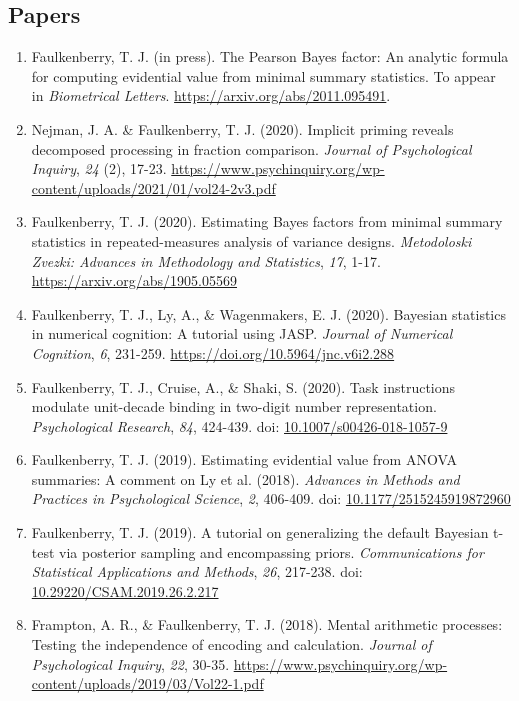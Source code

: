 \documentclass[article,10pt]{article}
\begin{document}
\subsection*{Papers}
\label{sec:org54b51a6}
\begin{enumerate}
\item Faulkenberry, T. J. (in press). The Pearson Bayes factor: An analytic formula for computing evidential value from minimal summary statistics. To appear in \emph{Biometrical Letters}. \url{https://arxiv.org/abs/2011.095491}.
\item Nejman, J. A. \& Faulkenberry, T. J. (2020). Implicit priming reveals decomposed processing in fraction comparison. \emph{Journal of Psychological Inquiry}, \emph{24} (2), 17-23. \url{https://www.psychinquiry.org/wp-content/uploads/2021/01/vol24-2v3.pdf}
\item Faulkenberry, T. J. (2020). Estimating Bayes factors from minimal summary statistics in repeated-measures analysis of variance designs. \emph{Metodoloski Zvezki: Advances in Methodology and Statistics}, \emph{17}, 1-17.  \url{https://arxiv.org/abs/1905.05569}
\item Faulkenberry, T. J., Ly, A., \& Wagenmakers, E. J. (2020). Bayesian statistics in numerical cognition: A tutorial using JASP. \emph{Journal of Numerical Cognition}, \emph{6}, 231-259. \url{https://doi.org/10.5964/jnc.v6i2.288}
\item Faulkenberry, T. J., Cruise, A., \& Shaki, S. (2020). Task instructions modulate unit-decade binding in two-digit number representation. \emph{Psychological Research}, \emph{84}, 424-439. doi: \href{https://dx.doi.org/10.1007/s00426-018-1057-9}{10.1007/s00426-018-1057-9}
\item Faulkenberry, T. J. (2019). Estimating evidential value from ANOVA summaries: A comment on Ly et al. (2018). \emph{Advances in Methods and Practices in Psychological Science}, \emph{2}, 406-409. doi: \href{https://doi.org/10.1177/2515245919872960}{10.1177/2515245919872960}
\item Faulkenberry, T. J. (2019). A tutorial on generalizing the default Bayesian t-test via posterior sampling and encompassing priors. \emph{Communications for Statistical Applications and Methods}, \emph{26}, 217-238. doi: \href{https://doi.org/10.29220/CSAM.2019.26.2.217}{10.29220/CSAM.2019.26.2.217}
\item Frampton, A. R., \& Faulkenberry, T. J. (2018). Mental arithmetic processes: Testing the independence of encoding and calculation. \emph{Journal of Psychological Inquiry}, \emph{22}, 30-35. \url{https://www.psychinquiry.org/wp-content/uploads/2019/03/Vol22-1.pdf}

\end{enumerate}
\end{document}
